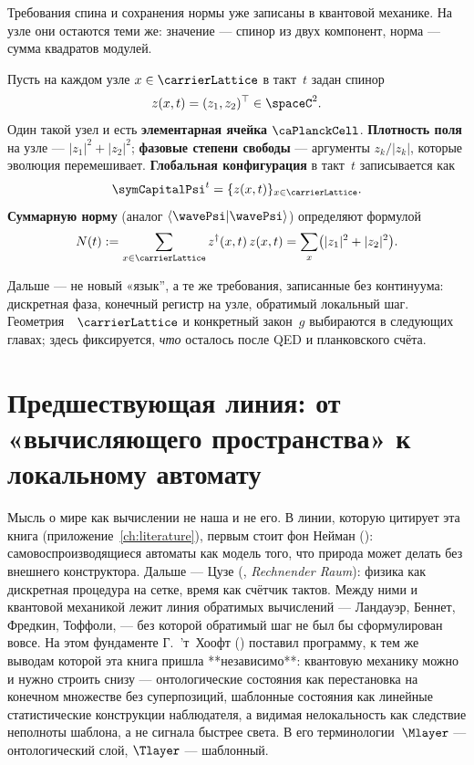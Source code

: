Требования спина и сохранения нормы уже записаны в квантовой механике.
На узле они остаются теми же:
значение --- спинор из двух компонент, норма --- сумма квадратов модулей.

\begin{definition}
\label{def:field-a3}
Пусть на каждом узле $x\in\carrierLattice$ в такт~$t$ задан спинор
\[
  z(x,t)=(z_1,z_2)^\top\in\spaceC^2.
\]
Один такой узел и есть \textbf{элементарная ячейка} $\caPlanckCell$.
\textbf{Плотность поля} на узле --- $|z_1|^2+|z_2|^2$;
\textbf{фазовые степени свободы} --- аргументы $z_k/|z_k|$, которые эволюция перемешивает.
\textbf{Глобальная конфигурация} в такт~$t$ записывается как
\[
  \symCapitalPsi^t=\{z(x,t)\}_{x\in\carrierLattice}.
\]
\textbf{Суммарную норму} (аналог $\langle\wavePsi|\wavePsi\rangle$) определяют формулой
\[
  N(t):=\sum_{x\in\carrierLattice} z^\dagger(x,t)\,z(x,t)=\sum_x\bigl(|z_1|^2+|z_2|^2\bigr).
\]
\end{definition}

Дальше --- не новый «язык'', а те же требования, записанные без континуума:
дискретная фаза, конечный регистр на узле, обратимый локальный шаг.
Геометрия~\latGCK\ $\carrierLattice$ и конкретный закон~$g$ выбираются в следующих главах;
здесь фиксируется, \emph{что} осталось после QED и планковского счёта.

\section{Предшествующая линия: от «вычисляющего пространства» к локальному автомату}
\label{sec:thooft-programme}

Мысль о мире как вычислении не наша и не его. В линии, которую цитирует эта книга
(приложение~\ref{ch:literature}), первым стоит фон Нейман (\textcite{vonneumann1966}):
самовоспроизводящиеся автоматы как модель того, что природа может делать без внешнего
конструктора. Дальше --- Цузе (\textcite{zuse1969}, \emph{Rechnender Raum}): физика как
дискретная процедура на сетке, время как счётчик тактов. Между ними и квантовой механикой
лежит линия обратимых вычислений --- Ландауэр, Беннет, Фредкин, Тоффоли, --- без которой
обратимый шаг не был бы сформулирован вовсе. На этом фундаменте Г.~’т~Хоофт
(\textcite{tHooft2016}) поставил программу, к тем же выводам которой эта книга пришла
**независимо**: квантовую механику можно и нужно строить снизу --- онтологические состояния
как перестановка на конечном множестве без суперпозиций, шаблонные состояния как линейные
статистические конструкции наблюдателя, а видимая нелокальность как следствие неполноты
шаблона, а не сигнала быстрее света.
В его терминологии~$\Mlayer$ --- онтологический слой, $\Tlayer$ --- шаблонный.

